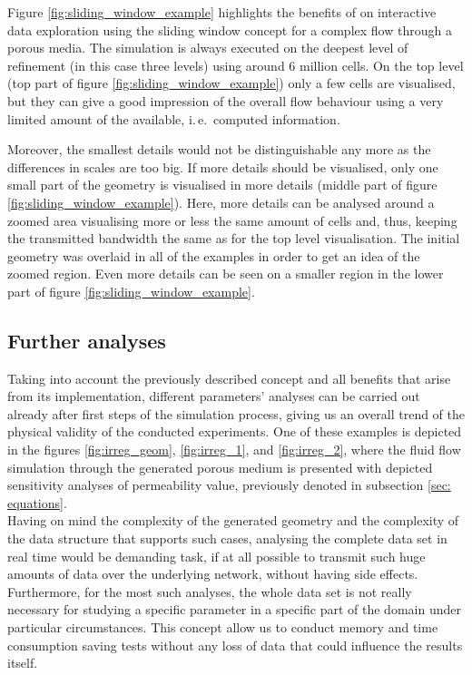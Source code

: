 \documentclass[10pt, conference]{IEEEtran}
\begin{document}
Figure \ref{fig:sliding_window_example} highlights the benefits of on interactive data exploration using the sliding window concept for a complex flow through a porous media. The simulation is always executed on the deepest level of refinement (in this case three levels) using around 6 million cells. On the top level (top part of figure  \ref{fig:sliding_window_example}) only a few cells are visualised, but they can give a good impression of the overall flow behaviour using a very limited amount of the available, i.\,e.\ computed information.

Moreover, the smallest details would not be distinguishable any more as the differences in scales are too big. If more details should be visualised, only one small part of the geometry is visualised in more details (middle part of figure  \ref{fig:sliding_window_example}). Here, more details can be analysed around a zoomed area visualising more or less the same amount of cells and, thus, keeping the transmitted bandwidth the same as for the top level visualisation. The initial geometry was overlaid in all of the examples in order to get an idea of the zoomed region. Even more details can be seen on a smaller region in the lower part of figure  \ref{fig:sliding_window_example}.

\subsection{Further analyses}
\vspace{0.2cm}
Taking into account the previously described concept and all benefits that arise from its implementation, different parameters' analyses can be carried out already after first steps of the simulation process, giving us an overall trend of the physical validity of the conducted experiments. One of these examples is depicted in the figures \ref{fig:irreg_geom}, \ref{fig:irreg_1}, and \ref{fig:irreg_2}, where the fluid flow simulation through the generated porous medium is presented with depicted sensitivity analyses of permeability value, previously denoted in subsection \ref{sec: equations}.  \\
Having on mind the complexity of the generated geometry and the complexity of the data structure that supports such cases, analysing the complete data set in real time would be demanding task, if at all possible to transmit such huge amounts of data over the underlying network, without having side effects. Furthermore, for the most such analyses, the whole data set is not really necessary for studying a specific parameter in a specific part of the domain under particular circumstances. This concept allow us to conduct memory and time consumption saving tests without any loss of data that could influence the results itself.
\end{document}
